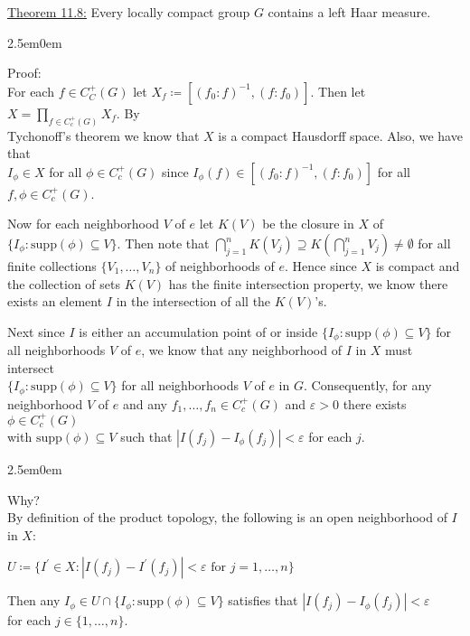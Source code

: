 \documentclass{book}
\newcommand{\exTwo}{%
   \color{Purple}%
   \fontsize{13}{15}\selectfont%
}
\newcommand{\exThreeP}{%
   \color{RedViolet}%
   \fontsize{12}{14}\selectfont%
}
\newcommand{\exPPP}{%
   \color{VioletRed}%
   \fontsize{12}{14}\selectfont%
}
\newenvironment{myIndent}{%
   \begin{adjustwidth}{2.5em}{0em}%
}{%
   \end{adjustwidth}%
}
\newcommand{\supp}{\mathrm{supp}}
\newcommand{\retTwo}{\hfill\bigbreak}
\begin{document}
\exTwo\ul{Theorem 11.8:} Every locally compact group $G$ contains a left Haar measure.
\begin{myIndent}\exThreeP
	Proof:\\
	For each $f \in C_C^+(G)$ let $X_f \coloneqq [(f_0 : f)^{-1}, (f : f_0)]$. Then let $X = \prod_{f \in C_c^+(G)} X_f$. By\\ [-1pt] Tychonoff's theorem we know that $X$ is a compact Hausdorff space. Also, we have that\\ $I_\phi \in X$ for all $\phi \in C_c^+(G)$ since $I_\phi(f) \in [(f_0 : f)^{-1}, (f : f_0)]$ for all $f, \phi \in C_c^+(G)$.\retTwo

	Now for each  neighborhood $V$ of $e$ let $K(V)$ be the closure in $X$ of $\{I_\phi : \supp(\phi) \subseteq V\}$. Then note that $\bigcap_{j=1}^n K(V_j) \supseteq K(\bigcap_{j=1}^n V_j) \neq \emptyset$  for all finite collections $\{V_1, \ldots, V_n\}$ of neighborhoods of $e$. Hence since $X$ is compact and the collection of sets $K(V)$ has the finite intersection property, we know there exists an element $I$ in the intersection of all the $K(V)$'s.\retTwo

	Next since $I$ is either an accumulation point of or inside $\{I_\phi : \supp(\phi) \subseteq V\}$ for\\ all neighborhoods $V$ of $e$, we know that any neighborhood of $I$ in $X$ must intersect\\ $\{I_\phi : \supp(\phi) \subseteq V\}$ for all neighborhoods $V$ of $e$ in $G$. Consequently, for any\\ neighborhood $V$ of $e$ and any $f_1, \ldots, f_n \in C_c^+(G)$ and $\varepsilon > 0$ there exists $\phi \in C_c^+(G)$\\ with $\supp(\phi) \subseteq V$ such that $|I(f_j) - I_\phi(f_j)| < \varepsilon$ for each $j$.

	\begin{myIndent}\exPPP
		Why?\\
		By definition of the product topology, the following is an open neighborhood of $I$\\ in $X$:
		
		{\centering$U \coloneqq \{I^\prime \in X : |I(f_j) - I^\prime(f_j)| < \varepsilon \text{ for } j =1, \ldots, n\}$\retTwo\par}
		
		Then any $I_\phi \in U \cap \{I_\phi : \supp(\phi) \subseteq V\}$ satisfies that $|I(f_j) - I_\phi(f_j)| < \varepsilon$\\ for each $j \in \{1, \ldots, n\}$.\retTwo
	\end{myIndent}


\end{myIndent}
\end{document}
